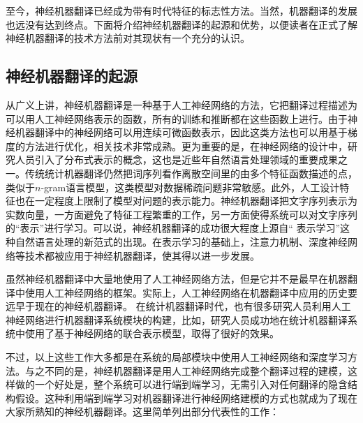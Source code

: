 \parinterval 至今，神经机器翻译已经成为带有时代特征的标志性方法。当然，机器翻译的发展也远没有达到终点。下面将介绍神经机器翻译的起源和优势，以便读者在正式了解神经机器翻译的技术方法前对其现状有一个充分的认识。

\subsection{神经机器翻译的起源}
\parinterval 从广义上讲，神经机器翻译是一种基于人工神经网络的方法，它把翻译过程描述为可以用人工神经网络表示的函数，所有的训练和推断都在这些函数上进行。由于神经机器翻译中的神经网络可以用连续可微函数表示，因此这类方法也可以用基于梯度的方法进行优化，相关技术非常成熟。更为重要的是，在神经网络的设计中，研究人员引入了分布式表示的概念，这也是近些年自然语言处理领域的重要成果之一。传统统计机器翻译仍然把词序列看作离散空间里的由多个特征函数描述的点，类似于$n$-gram语言模型，这类模型对数据稀疏问题非常敏感。此外，人工设计特征也在一定程度上限制了模型对问题的表示能力。神经机器翻译把文字序列表示为实数向量，一方面避免了特征工程繁重的工作，另一方面使得系统可以对文字序列的“表示”进行学习。可以说，神经机器翻译的成功很大程度上源自“ 表示学习”这种自然语言处理的新范式的出现。在表示学习的基础上，注意力机制、深度神经网络等技术都被应用于神经机器翻译，使其得以进一步发展。

\parinterval 虽然神经机器翻译中大量地使用了人工神经网络方法，但是它并不是最早在机器翻译中使用人工神经网络的框架。实际上，人工神经网络在机器翻译中应用的历史要远早于现在的神经机器翻译。 在统计机器翻译时代，也有很多研究人员利用人工神经网络进行机器翻译系统模块的构建，比如，研究人员成功地在统计机器翻译系统中使用了基于神经网络的联合表示模型，取得了很好的效果。

\parinterval 不过，以上这些工作大多都是在系统的局部模块中使用人工神经网络和深度学习方法。与之不同的是，神经机器翻译是用人工神经网络完成整个翻译过程的建模，这样做的一个好处是，整个系统可以进行端到端学习，无需引入对任何翻译的隐含结构假设。这种利用端到端学习对机器翻译进行神经网络建模的方式也就成为了现在大家所熟知的神经机器翻译。这里简单列出部分代表性的工作：

